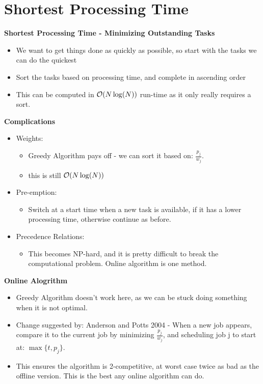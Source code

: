 \documentclass[grey,handout]{beamer}
\renewcommand{\frametitle}[1]{\begin{center}\textbf{#1}\end{center}}
\def\BigO{{\cal O}}
\begin{document}
\section{Shortest Processing Time}

\begin{frame}
  \frametitle{Shortest Processing Time - Minimizing Outstanding Tasks}
  \begin{itemize}
  \item We want to get things done as quickly as possible, so start
    with the tasks we can do the quickest
  \item Sort the tasks based on processing time, and complete in
    ascending order
  \item This can be computed in $\BigO ( N \log( N ) )$ run-time as it
    only really requires a sort.
  \end{itemize}
\end{frame}

\begin{frame}
  \frametitle{ Complications}
  \begin{itemize}
  \item Weights:
    \begin{itemize}
    \item Greedy Algorithm pays off - we can sort it based on:
      $\frac{p_j}{w_j}$.
    \item this is still $\BigO( N \log( N ) )$
    \end{itemize}
  \item Pre-emption:
    \begin{itemize}
    \item Switch at a start time when a new task is available, if it
      has a lower processing time, otherwise continue as before.
    \end{itemize}
  \item Precedence Relations:
    \begin{itemize}
    \item This becomes NP-hard, and it is pretty difficult to break
      the computational problem. Online algorithm is one method.
    \end{itemize}
  \end{itemize}
\end{frame}

\begin{frame}
  \frametitle{Online Alogrithm}
  \begin{itemize}
  \item Greedy Algorithm doesn't work here, as we can be stuck doing something
    when it is not optimal.
  \item Change suggested by: Anderson and Potts 2004 - When a new job appears,
    compare it to the current job by minimizing $\frac{p_j}{w_j}$, and
    scheduling job j to start at: $\max \{ t, p_j \}$.
  \item This ensures the algorithm is 2-competitive, at worst case twice as bad
    as the offline version. This is the best any online algorithm can do.
  \end{itemize}
\end{frame}
\end{document}
